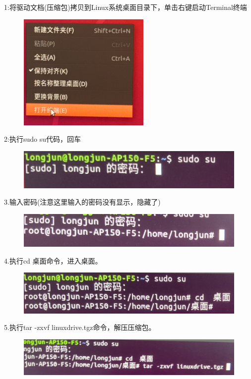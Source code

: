 \documentclass[openbib]{article}
\begin{document}
1:将驱动文档(压缩包)拷贝到Linux系统桌面目录下，单击右键启动Terminal终端
\begin{figure}[H]
	\centering
	\includegraphics[scale=0.3]{39}
\end{figure}

2:执行sudo su代码，回车
\begin{figure}[H]
	\centering
	\includegraphics[scale=0.3]{40}
\end{figure}

3.输入密码(注意这里输入的密码没有显示，隐藏了)
\begin{figure}[H]
	\centering
	\includegraphics[scale=0.3]{41}
\end{figure}

4.执行cd 桌面命令，进入桌面。
\begin{figure}[H]
	\centering
	\includegraphics[scale=0.3]{42}
\end{figure}

5.执行tar -zxvf linuxdrive.tgz命令，解压压缩包。
\begin{figure}[H]
	\centering
	\includegraphics[scale=0.3]{43}
\end{figure}
\end{document}
